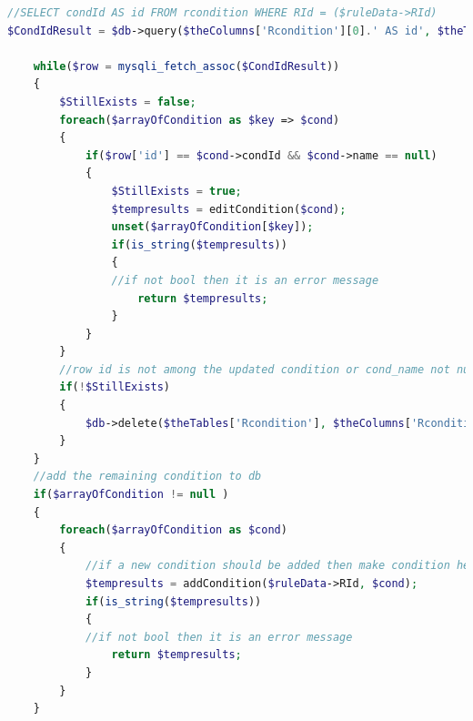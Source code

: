 \begin{lstlisting}[language=PHP, label=code:UpdateRules, caption=editRule code sample]
//SELECT condId AS id FROM rcondition WHERE RId = ($ruleData->RId)
$CondIdResult = $db->query($theColumns['Rcondition'][0].' AS id', $theTables['Rcondition'], $theColumns['Rcondition'][1] . " = " . $ruleData->RId );
				
	while($row = mysqli_fetch_assoc($CondIdResult))
	{
		$StillExists = false;
		foreach($arrayOfCondition as $key => $cond)
		{
			if($row['id'] == $cond->condId && $cond->name == null)				//edit the condition in db
			{
				$StillExists = true;
				$tempresults = editCondition($cond);
				unset($arrayOfCondition[$key]);
				if(is_string($tempresults))
				{
				//if not bool then it is an error message
					return $tempresults;
				}
			}	
		}
		//row id is not among the updated condition or cond_name not null so delete 
		if(!$StillExists)
		{
			$db->delete($theTables['Rcondition'], $theColumns['Rcondition'][0] . " = " .$row['id']);
		}
	}
	//add the remaining condition to db
	if($arrayOfCondition != null )
	{
		foreach($arrayOfCondition as $cond)
		{
			//if a new condition should be added then make condition here
			$tempresults = addCondition($ruleData->RId, $cond);
			if(is_string($tempresults))
			{
			//if not bool then it is an error message
				return $tempresults;
			}
		}
	}
\end{lstlisting}



